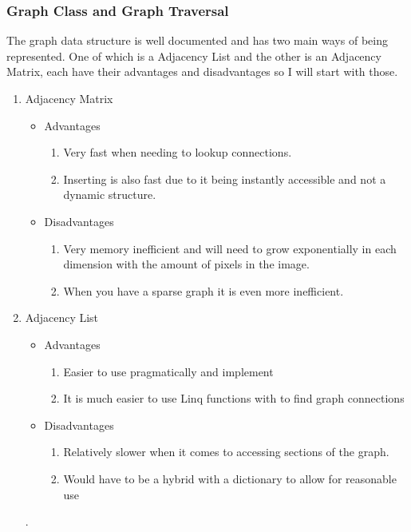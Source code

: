 \begin{flushleft}
        \subsubsection{Graph Class and Graph Traversal}
        The graph data structure is well documented and has two main ways of being represented. One of which is a Adjacency List and the other is an Adjacency Matrix, each have their advantages and disadvantages so I will start with those.

        \begin{enumerate}
            \item Adjacency Matrix
            \begin{itemize}
                \item Advantages
                    \begin{enumerate}
                        \item[] Very fast when needing to lookup connections.
                        \item[] Inserting is also fast due to it being instantly accessible and not a dynamic structure.
                    \end{enumerate}
                \item Disadvantages
                \begin{enumerate}
                        \item[] Very memory inefficient and will need to grow exponentially in each dimension with the amount of pixels in the image.
                        \item[] When you have a sparse graph it is even more inefficient.
                \end{enumerate}
            \end{itemize}
            \item Adjacency List
                \begin{itemize}
                    \item Advantages
                    \begin{enumerate}
                        \item[] Easier to use pragmatically and implement
                        \item[] It is much easier to use Linq functions with to find graph connections
                    \end{enumerate}
                    \item Disadvantages
                    \begin{enumerate}
                        \item[] Relatively slower when it comes to accessing sections of the graph.
                        \item[] Would have to be a hybrid with a dictionary to allow for reasonable use
                    \end{enumerate}
            \end{itemize}.
        \end{enumerate}


\end{flushleft}
